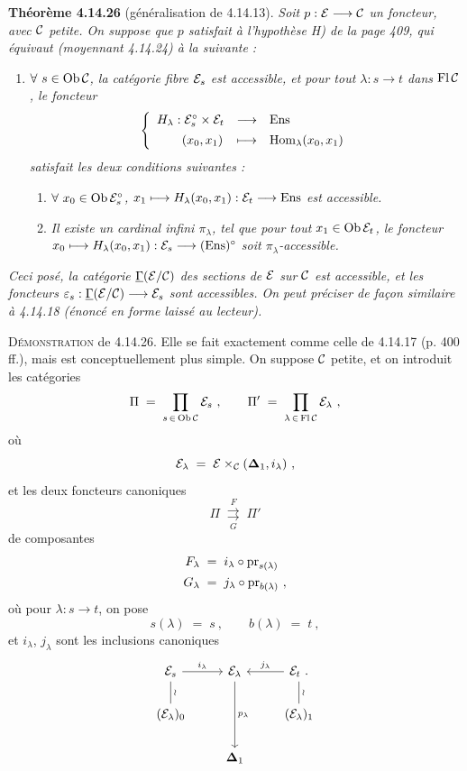 \textbf{Théorème 4.14.26} (généralisation de 4.14.13). \textit{Soit $p : \mathcal{E} \longrightarrow \mathcal{C}$ un foncteur, avec $\mathcal{C}$ petite. On suppose que $p$ satisfait à l'hypothèse H) de la page 409, qui équivaut (moyennant 4.14.24) à la suivante :}
\begin{enumerate}
\item[\textit{H$'$)}] \textit{$\forall\ s \in \operatorname{Ob}\mathcal{C}$, la catégorie fibre $\mathcal{E}_s$ est accessible, et pour tout $\lambda : s \longrightarrow t$ dans $\operatorname{Fl}\mathcal{C}$, le foncteur}
\[
\left\{
\begin{array}{lcl}
H_\lambda : \mathcal{E}_s^\circ \times \mathcal{E}_t & \longrightarrow & \mathrm{Ens}\\[1ex]
\qquad (x_0,x_1) & \longmapsto & \operatorname{Hom}_\lambda(x_0,x_1)
\end{array}
\right.
\]
\textit{satisfait les deux conditions suivantes :}
\begin{enumerate}
\item[\textit{a)}] \textit{$\forall\ x_0 \in \operatorname{Ob}\mathcal{E}_s^\circ$, $x_1 \longmapsto H_\lambda(x_0,x_1) : \mathcal{E}_t \longrightarrow \mathrm{Ens}$ est accessible.}
\item[\textit{b)}] \textit{Il existe un cardinal infini $\pi_\lambda$, tel que pour tout $x_1 \in \operatorname{Ob}\mathcal{E}_t$, le foncteur $x_0 \longmapsto H_\lambda(x_0,x_1) : \mathcal{E}_s \longrightarrow (\mathrm{Ens})^\circ$ soit $\pi_\lambda$-accessible.}
\end{enumerate}
\end{enumerate}
\textit{Ceci posé, la catégorie $\underline{\Gamma}(\mathcal{E}/\mathcal{C})$ des sections de $\mathcal{E}$ sur $\mathcal{C}$ est accessible, et les foncteurs $\varepsilon_s : \underline{\Gamma}(\mathcal{E}/\mathcal{C}) \longrightarrow \mathcal{E}_s$ sont accessibles. On peut préciser de façon similaire à 4.14.18 (énoncé en forme laissé au lecteur).}

\textsc{Démonstration} de 4.14.26. Elle se fait exactement comme celle de 4.14.17 (p. 400 ff.), mais est conceptuellement plus simple. On suppose $\mathcal{C}$ petite, et on introduit les catégories
\[
\Pi \;=\; \prod_{s\,\in\,\operatorname{Ob}\mathcal{C}} \mathcal{E}_s\ , \qquad \Pi' \;=\; \prod_{\lambda\,\in\,\operatorname{Fl}\mathcal{C}} \mathcal{E}_\lambda\ ,
\]
où
\[
\mathcal{E}_\lambda \;=\; \mathcal{E} \times_{\mathcal{C}} (\mathbf{\Delta}_1, i_\lambda)\ ,
\]
et les deux foncteurs canoniques
\[
\Pi \;\underset{G}{\overset{F}{\rightrightarrows}}\; \Pi'
\]
de composantes
\[
\begin{aligned}
F_\lambda \;&=\; i_\lambda \circ \mathrm{pr}_{s(\lambda)}\\
G_\lambda \;&=\; j_\lambda \circ \mathrm{pr}_{b(\lambda)}\ ,
\end{aligned}
\]
où pour $\lambda : s \longrightarrow t$, on pose
\[
s(\lambda) \;=\; s\ , \qquad b(\lambda) \;=\; t\ ,
\]
et $i_\lambda$, $j_\lambda$ sont les inclusions canoniques
\[
\begin{tikzcd}
\cE_s \arrow[r,"i_\lambda"] \arrow[d,dash,"\wr"] & \cE_\lambda \arrow[dd,"p_\lambda"] & \cE_t\ . \arrow[l,"j_\lambda"'] \arrow[d,dash,"\wr"] \\
(\cE_\lambda)_0 & & (\cE_\lambda)_1 \\
& \mathbf{\Delta}_1 &
\end{tikzcd}
\]

